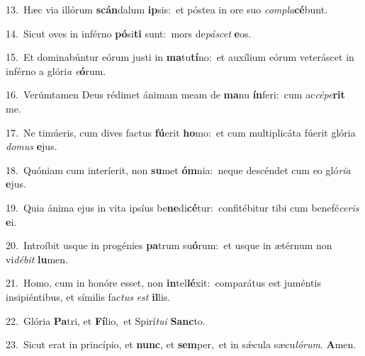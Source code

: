 {\numbfont\textcolor{\numbcolor}{13.}}~Hæc via illórum \textbf{scán}\-dalum \textbf{ip}\-sis:~\star et póstea in ore suo \textit{com}\-\textit{pla}\textbf{cé}bunt.\par
{\numbfont\textcolor{\numbcolor}{14.}}~Sicut oves in inférno \textbf{pó}\-si\textbf{ti} sunt:~\star mors de\-\textit{pá}\-\textit{scet} \textbf{e}\-os.\par
{\numbfont\textcolor{\numbcolor}{15.}}~Et dominabúntur eórum justi in \textbf{ma}\-tu\-\textbf{tí}\-no:~\star et auxílium eórum veteráscet in inférno a glóri\textit{a} \textit{e}\-\textbf{ó}rum.\par
{\numbfont\textcolor{\numbcolor}{16.}}~Verúmtamen Deus rédimet ánimam meam de \textbf{ma}\-nu \textbf{ín}\-feri:~\star cum ac\-\textit{cé}\-\textit{pe}\textbf{rit} me.\par
{\numbfont\textcolor{\numbcolor}{17.}}~Ne timúeris, cum dives factus \textbf{fú}\-erit \textbf{ho}\-mo:~\star et cum multiplicáta fúerit glória \textit{do}\-\textit{mus} \textbf{e}\-jus.\par
{\numbfont\textcolor{\numbcolor}{18.}}~Quóniam cum interíerit, non \textbf{su}\-met \textbf{óm}\-nia:~\star neque descéndet cum eo gló\-\textit{ri}\-\textit{a} \textbf{e}\-jus.\par
{\numbfont\textcolor{\numbcolor}{19.}}~Quia ánima ejus in vita ipsíus be\-\textbf{ne}\-di\-\textbf{cé}\-tur:~\star confitébitur tibi cum benefé\-\textit{ce}\-\textit{ris} \textbf{e}\-i.\par
{\numbfont\textcolor{\numbcolor}{20.}}~Introíbit usque in progénies \textbf{pa}\-trum su\-\textbf{ó}\-rum:~\star et usque in ætérnum non vi\-\textit{dé}\-\textit{bit} \textbf{lu}\-men.\par
{\numbfont\textcolor{\numbcolor}{21.}}~Homo, cum in honóre esset, non \textbf{in}\-tel\-\textbf{lé}\-xit:~\star comparátus est juméntis insipiéntibus, et símilis fac\textit{tus} \textit{est} \textbf{il}\-lis.\par
{\numbfont\textcolor{\numbcolor}{22.}}~Glória \textbf{Pa}\-tri, et \textbf{Fí}\-lio,~\star et Spirí\-\textit{tu}\-\textit{i} \textbf{Sanc}\-to.\par
{\numbfont\textcolor{\numbcolor}{23.}}~Sicut erat in princípio, et \textbf{nunc}\-, et \textbf{sem}\-per,~\star et in sǽcula sæcu\-\textit{ló}\-\textit{rum}. \textbf{A}\-men.\par
